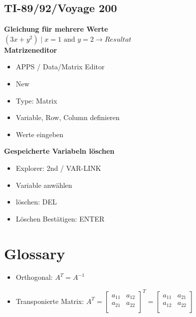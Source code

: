 \documentclass[a4paper]{scrartcl}
\begin{document}
	\subsection{TI-89/92/Voyage 200}
		\textbf{Gleichung für mehrere Werte}\\
		$(3x+y^2) \mid x=1 \text{ and } y=2 \to Resultat$\\
		\textbf{Matrizeneditor}
		\begin{itemize}
			 \item APPS / Data/Matrix Editor
			 \item New
			 \item Type: Matrix
			 \item Variable, Row, Column definieren
			 \item Werte eingeben
		\end{itemize}
			
		\textbf{Gespeicherte Variabeln löschen}
		\begin{itemize}
		\item Explorer: 2nd / VAR-LINK
		\item Variable anwählen
		\item löschen: DEL
		\item Löschen Bestätigen: ENTER
		\end{itemize}
		
\section{Glossary}
\begin{itemize}
  \item Orthogonal: $A^T = A^{-1}$
  \item Transponierte Matrix: $A^T = \begin{bmatrix}
  		a_{11}&a_{12}\\
		a_{21}&a_{22}\\
	\end{bmatrix}^T = \begin{bmatrix}
  		a_{11}&a_{21}\\
		a_{12}&a_{22}\\
	\end{bmatrix}$
\end{itemize}
\end{document}
